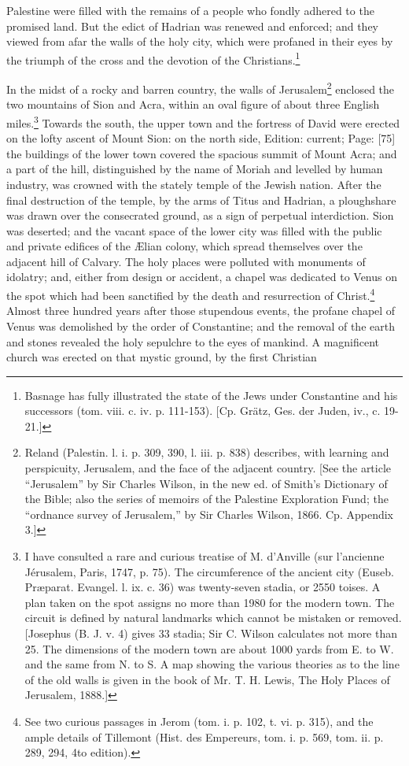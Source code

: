 Palestine were filled with the remains of a people who fondly adhered to the promised land. But the edict of Hadrian was renewed and enforced; and they viewed from afar the walls of the holy city, which were profaned in their eyes by the triumph of the cross and the devotion of the Christians.\footnote{Basnage has fully illustrated the state of the Jews under Constantine and his successors (tom. viii. c. iv. p. 111-153). [Cp. Grätz, Ges. der Juden, iv., c. 19-21.]}

In the midst of a rocky and barren country, the walls of Jerusalem\footnote{Reland (Palestin. l. i. p. 309, 390, l. iii. p. 838) describes, with learning and perspicuity, Jerusalem, and the face of the adjacent country. [See the article \texthebrew{“}Jerusalem\texthebrew{}” by Sir Charles Wilson, in the new ed. of Smith\texthebrew{}’s Dictionary of the Bible; also the series of memoirs of the Palestine Exploration Fund; the \texthebrew{“}ordnance survey of Jerusalem,\texthebrew{}” by Sir Charles Wilson, 1866. Cp. Appendix 3.]} enclosed the two mountains of Sion and Acra, within an oval figure of about three English miles.\footnote{I have consulted a rare and curious treatise of M. d\texthebrew{}’Anville (sur l\texthebrew{}’ancienne Jérusalem, Paris, 1747, p. 75). The circumference of the ancient city (Euseb. Præparat. Evangel. l. ix. c. 36) was twenty-seven stadia, or 2550 toises. A plan taken on the spot assigns no more than 1980 for the modern town. The circuit is defined by natural landmarks which cannot be mistaken or removed. [Josephus (B. J. v. 4) gives 33 stadia; Sir C. Wilson calculates not more than 25. The dimensions of the modern town are about 1000 yards from E. to W. and the same from N. to S. A map showing the various theories as to the line of the old walls is given in the book of Mr. T. H. Lewis, The Holy Places of Jerusalem, 1888.]} Towards the south, the upper town and the fortress of David were erected on the lofty ascent of Mount Sion: on the north side, Edition: current; Page: [75] the buildings of the lower town covered the spacious summit of Mount Acra; and a part of the hill, distinguished by the name of Moriah and levelled by human industry, was crowned with the stately temple of the Jewish nation. After the final destruction of the temple, by the arms of Titus and Hadrian, a ploughshare was drawn over the consecrated ground, as a sign of perpetual interdiction. Sion was deserted; and the vacant space of the lower city was filled with the public and private edifices of the Ælian colony, which spread themselves over the adjacent hill of Calvary. The holy places were polluted with monuments of idolatry; and, either from design or accident, a chapel was dedicated to Venus on the spot which had been sanctified by the death and resurrection of Christ.\footnote{See two curious passages in Jerom (tom. i. p. 102, t. vi. p. 315), and the ample details of Tillemont (Hist. des Empereurs, tom. i. p. 569, tom. ii. p. 289, 294, 4to edition).} Almost three hundred years after those stupendous events, the profane chapel of Venus was demolished by the order of Constantine; and the removal of the earth and stones revealed the holy sepulchre to the eyes of mankind. A magnificent church was erected on that mystic ground, by the first Christian 
